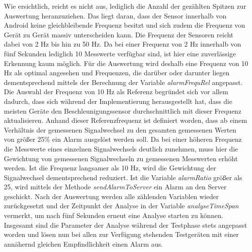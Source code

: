 Wie ersichtlich, reicht es nicht aus, lediglich die Anzahl der gezählten Spitzen zur Auswertung heranzuziehen. Das liegt daran, dass der Sensor innerhalb von Android keine gleichbleibende Frequenz besitzt und sich zudem die Frequenz von Gerät zu Gerät massiv unterscheiden kann. Die Frequenz der Sensoren reicht dabei von 2 Hz bis hin zu 50 Hz. Da bei einer Frequenz von 2 Hz innerhalb von fünf Sekunden lediglich 10 Messwerte verfügbar sind, ist hier eine zuverlässige Erkennung kaum möglich. Für die Auswertung wird deshalb eine Frequenz von 10 Hz als optimal angesehen und Frequenzen, die darüber oder darunter liegen dementsprechend mittels der Berechnung der Variable \textit{alarmFrequRel} angepasst. Die Auswahl der Frequenz von 10 Hz als Referenz begründet sich vor allem dadurch, dass sich während der Implementierung herausgestellt hat, dass die meisten Geräte den Beschleunigungssensor durchschnittlich mit dieser Frequenz aktualisieren. Anhand dieser Referenzfrequenz ist definiert worden, dass ab einem Verhältnis der gemessenen Signalwechsel zu den gesamten gemessenen Werten von größer 25\% ein Alarm ausgelöst werden soll. Da bei einer höheren Frequenz die Messwerte eines einzelnen Signalwechsels deutlich zunehmen, muss hier die Gewichtung von gemessenen Signalwechseln zu gemessenen Messwerten erhöht werden. Ist die Frequenz langsamer als 10 Hz, wird die Gewichtung der Signalwechsel dementsprechend reduziert. Ist die Variable \textit{alarmRatio} größer als 25, wird mittels der Methode \textit{sendAlarmToServer} ein Alarm an den Server geschickt. Nach der Auswertung werden alle zählenden Variablen wieder zurückgesetzt und der Zeitpunkt der Analyse in der Variable \textit{analyseTimeSpan} vermerkt, um nach fünf Sekunden erneut eine Analyse starten zu können.\\
Insgesamt sind die Parameter der Analyse während der Testphase stets angepasst worden und lösen nun bei allen zur Verfügung stehenden Testgeräten mit einer annähernd gleichen Empfindlichkeit einen Alarm aus.
\newpage